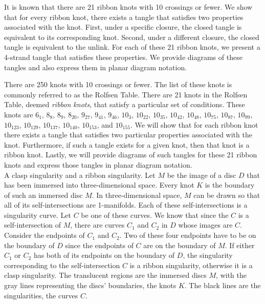 
\diagrams
\theorems

\begin{paperabs}
It is known that there are 21 ribbon knots with 10 crossings or fewer.
We show that for every ribbon knot, there exists a tangle that satisfies two
properties associated with the knot.
First, under a specific closure, the closed tangle is equivalent to its
corresponding knot.
Second, under a different closure, the closed tangle is equivalent to the
unlink.
For each of these 21 ribbon knots, we present a 4-strand tangle that
satisfies these properties.
We provide diagrams of these tangles and also express them in planar diagram
notation.
\end{paperabs}
\begin{paper}

There are 250 knots with 10 crossings or fewer.
The list of these knots is commonly referred to as the Rolfsen Table.
There are 21 knots in the Rolfsen Table, deemed \textit{ribbon knots}, that
satisfy a particular set of conditions.
These knots are $6_1$, $8_8$, $8_9$, $8_{20}$, $9_{27}$, $9_{41}$, $9_{46}$,
$10_3$, $10_{22}$, $10_{35}$, $10_{42}$, $10_{48}$, $10_{75}$, $10_{87}$,
$10_{99}$, $10_{123}$, $10_{129}$, $10_{137}$, $10_{140}$, $10_{153}$, and
$10_{155}$.
We will show that for each ribbon knot there exists a tangle that satisfies two
particular properties associated with the knot.
Furthermore, if such a tangle exists for a given knot, then that knot is a
ribbon knot.
Lastly, we will provide diagrams of such tangles for these 21 ribbon knots and
express those tangles in planar diagram notation.\\

{A clasp singularity and a ribbon singularity.
Let $M$ be the image of a disc $D$ that has been immersed into three-dimensional
space.
Every knot $K$ is the boundary of such an immersed disc $M$.
In three-dimensional space, $M$ can be drawn so that all of its
self-intersections are 1-manifolds.
Each of these self-intersections is a singularity curve.
Let $C$ be one of these curves.
We know that since the $C$ is a self-intersection of $M$, there are curves $C_1$
and $C_2$ in $D$ whose images are $C$.
Consider the endpoints of $C_1$ and $C_2$.
Two of these four endpoints have to be on the boundary of $D$ since the
endpoints of $C$ are on the boundary of $M$.
If either $C_1$ or $C_2$ has both of its endpoints on the boundary of $D$, the
singularity corresponding to the self-intersection $C$ is a ribbon singularity,
otherwise it is a clasp singularity.
The translucent regions are the immersed discs $M$, with the gray lines
representing the discs' boundaries, the knots $K$.
The black lines are the singularities, the curves $C$.}\\


\end{paper}
